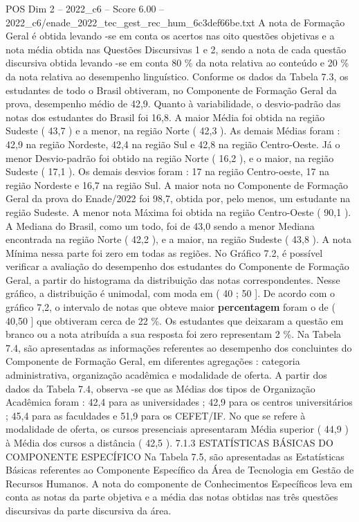 \begin{textsample}{POS Dim 2 – 2022\_c6 – Score 6.00 – 2022\_c6/enade\_2022\_tec\_gest\_rec\_hum\_6c3def66be.txt}
A nota de Formação Geral é obtida levando -se em conta os acertos nas oito questões objetivas e a nota média obtida nas Questões Discursivas 1 e 2, sendo a nota de cada questão discursiva obtida levando -se em conta 80 \% da nota relativa ao conteúdo e 20 \% da nota relativa ao desempenho linguístico.
Conforme os dados da Tabela 7.3, os estudantes de todo o Brasil obtiveram, no Componente de Formação Geral da prova, desempenho médio de 42,9.
Quanto à variabilidade, o desvio-padrão das notas dos estudantes do Brasil foi 16,8.
A maior Média foi obtida na região Sudeste ( 43,7 ) e a menor, na região Norte ( 42,3 ).
As demais Médias foram : 42,9 na região Nordeste, 42,4 na região Sul e 42,8 na região Centro-Oeste.
Já o menor Desvio-padrão foi obtido na região Norte ( 16,2 ), e o maior, na região Sudeste ( 17,1 ).
Os demais desvios foram : 17 na região Centro-oeste, 17 na região Nordeste e 16,7 na região Sul.
A maior nota no Componente de Formação Geral da prova do Enade/2022 foi 98,7, obtida por, pelo menos, um estudante na região Sudeste.
A menor nota Máxima foi obtida na região Centro-Oeste ( 90,1 ).
A Mediana do Brasil, como um todo, foi de 43,0 sendo a menor Mediana encontrada na região Norte ( 42,2 ), e a maior, na região Sudeste ( 43,8 ).
A nota Mínima nessa parte foi zero em todas as regiões.
No Gráfico 7.2, é possível verificar a avaliação do desempenho dos estudantes do Componente de Formação Geral, a partir do histograma da distribuição das notas correspondentes.
Nesse gráfico, a distribuição é unimodal, com moda em ( 40 ; 50 ].
De acordo com o gráfico 7,2, o intervalo de notas que obteve maior \textbf{percentagem} foram o de ( 40,50 ] que obtiveram cerca de 22 \%.
Os estudantes que deixaram a questão em branco ou a nota atribuída a sua resposta foi zero representam 2 \%.
Na Tabela 7.4, são apresentadas as informações referentes ao desempenho dos concluintes do Componente de Formação Geral, em diferentes agregações : categoria administrativa, organização acadêmica e modalidade de oferta.
A partir dos dados da Tabela 7.4, observa -se que as Médias dos tipos de Organização Acadêmica foram : 42,4 para as universidades ; 42,9 para os centros universitários ; 45,4 para as faculdades e 51,9 para os CEFET/IF.
No que se refere à modalidade de oferta, os cursos presenciais apresentaram Média superior ( 44,9 ) à Média dos cursos a distância ( 42,5 ). 7.1.3 ESTATÍSTICAS BÁSICAS DO COMPONENTE ESPECÍFICO Na Tabela 7.5, são apresentadas as Estatísticas Básicas referentes ao Componente Específico da Área de Tecnologia em Gestão de Recursos Humanos.
A nota do componente de Conhecimentos Específicos leva em conta as notas da parte objetiva e a média das notas obtidas nas três questões discursivas da parte discursiva da área.

\end{textsample}
